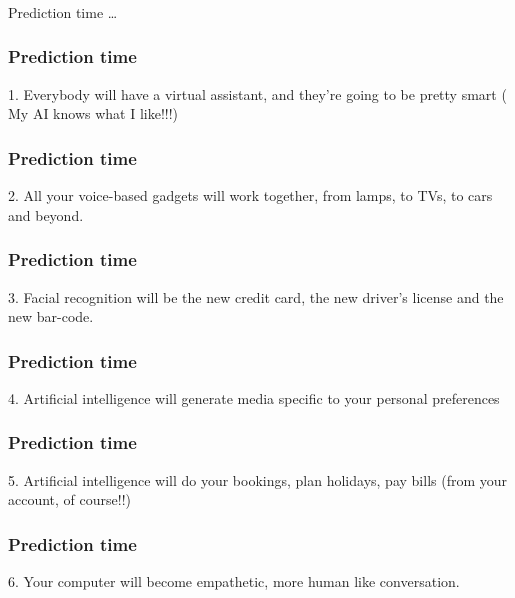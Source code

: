 \begin{frame}[fragile]\frametitle{}
\begin{center}
{\Large Prediction time \ldots}
\end{center}
\end{frame}


\begin{frame}[fragile]\frametitle{Prediction time}
1. Everybody will have a virtual assistant, and they're going to be pretty smart ( My AI knows what I like!!!)
\end{frame}

\begin{frame}[fragile]\frametitle{Prediction time}
2. All your voice-based gadgets will work together, from lamps, to TVs, to cars and beyond. 
\end{frame}

\begin{frame}[fragile]\frametitle{Prediction time}
3. Facial recognition will be the new credit card, the new driver's license and the new bar-code.
\end{frame}

\begin{frame}[fragile]\frametitle{Prediction time}
4. Artificial intelligence will generate media specific to your personal preferences
\end{frame}

\begin{frame}[fragile]\frametitle{Prediction time}
5. Artificial intelligence will do your bookings, plan holidays, pay bills (from your account, of course!!)
\end{frame}

\begin{frame}[fragile]\frametitle{Prediction time}
6. Your computer will become empathetic, more human like conversation.
\end{frame}

